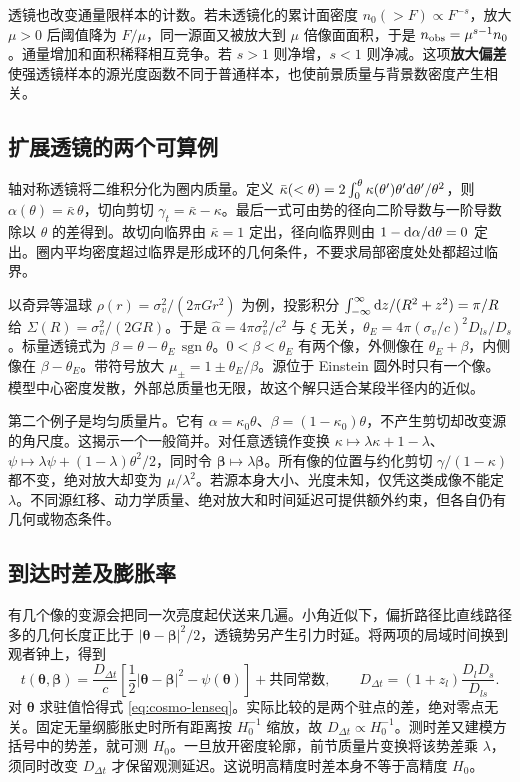 透镜也改变通量限样本的计数。若未透镜化的累计面密度 $n_0(>F)\propto F^{-s}$，放大 $\mu>0$ 后阈值降为 $F/\mu$，同一源面又被放大到 $\mu$ 倍像面面积，于是 $n_{\rm obs}=\mu^{s-1}n_0$。通量增加和面积稀释相互竞争。若 $s>1$ 则净增，$s<1$ 则净减。这项\textbf{放大偏差}使强透镜样本的源光度函数不同于普通样本，也使前景质量与背景数密度产生相关。

\subsection{扩展透镜的两个可算例}

轴对称透镜将二维积分化为圈内质量。定义 $\bar\kappa(<\theta)=2\int_0^\theta\kappa(\theta')\theta'\dd\theta'/\theta^2$，则 $\alpha(\theta)=\bar\kappa\,\theta$，切向剪切 $\gamma_t=\bar\kappa-\kappa$。最后一式可由势的径向二阶导数与一阶导数除以 $\theta$ 的差得到。故切向临界由 $\bar\kappa=1$ 定出，径向临界则由 $1-\dd\alpha/\dd\theta=0$ 定出。圈内平均密度超过临界是形成环的几何条件，不要求局部密度处处都超过临界。

以奇异等温球 $\rho(r)=\sigma_v^2/(2\pi Gr^2)$ 为例，投影积分 $\int_{-\infty}^{\infty}\dd z/(R^2+z^2)=\pi/R$ 给 $\Sigma(R)=\sigma_v^2/(2GR)$。于是 $\hat\alpha=4\pi\sigma_v^2/c^2$ 与 $\xi$ 无关，$\theta_E=4\pi(\sigma_v/c)^2D_{ls}/D_s$。标量透镜式为 $\beta=\theta-\theta_E\,\operatorname{sgn}\theta$。$0<\beta<\theta_E$ 有两个像，外侧像在 $\theta_E+\beta$，内侧像在 $\beta-\theta_E$。带符号放大 $\mu_\pm=1\pm\theta_E/\beta$。源位于 Einstein 圆外时只有一个像。模型中心密度发散，外部总质量也无限，故这个解只适合某段半径内的近似。

第二个例子是均匀质量片。它有 $\alpha=\kappa_0\theta$、$\beta=(1-\kappa_0)\theta$，不产生剪切却改变源的角尺度。这揭示一个一般简并。对任意透镜作变换 $\kappa\mapsto\lambda\kappa+1-\lambda$、$\psi\mapsto\lambda\psi+(1-\lambda)\theta^2/2$，同时令 $\bm\beta\mapsto\lambda\bm\beta$。所有像的位置与约化剪切 $\gamma/(1-\kappa)$ 都不变，绝对放大却变为 $\mu/\lambda^2$。若源本身大小、光度未知，仅凭这类成像不能定 $\lambda$。不同源红移、动力学质量、绝对放大和时间延迟可提供额外约束，但各自仍有几何或物态条件。

\subsection{到达时差及膨胀率}

有几个像的变源会把同一次亮度起伏送来几遍。小角近似下，偏折路径比直线路径多的几何长度正比于 $|\bm\theta-\bm\beta|^2/2$，透镜势另产生引力时延。将两项的局域时间换到观者钟上，得到
\begin{equation}\label{eq:cosmo-delay}
 t(\bm\theta,\bm\beta)=\frac{D_{\Delta t}}{c}
 \left[\frac12|\bm\theta-\bm\beta|^2-\psi(\bm\theta)\right]+\text{共同常数},
 \qquad D_{\Delta t}=(1+z_l)\frac{D_lD_s}{D_{ls}}.
\end{equation}
对 $\bm\theta$ 求驻值恰得式 \eqref{eq:cosmo-lenseq}。实际比较的是两个驻点的差，绝对零点无关。固定无量纲膨胀史时所有距离按 $H_0^{-1}$ 缩放，故 $D_{\Delta t}\propto H_0^{-1}$。测时差又建模方括号中的势差，就可测 $H_0$。一旦放开密度轮廓，前节质量片变换将该势差乘 $\lambda$，须同时改变 $D_{\Delta t}$ 才保留观测延迟。这说明高精度时差本身不等于高精度 $H_0$。

